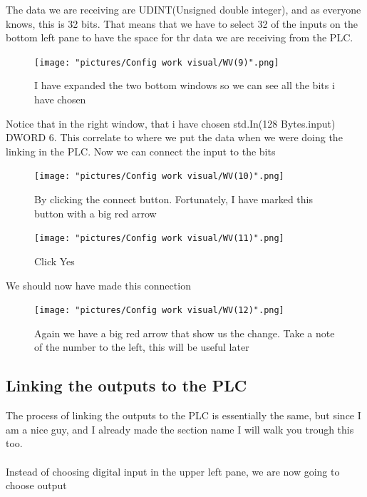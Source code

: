 \documentclass{article}
\begin{document}
\newpage

The data we are receiving are UDINT(Unsigned double integer), and as everyone knows, this is 32 bits. That means that we have to select 32 of the inputs on the bottom left pane to have the space for thr data we are receiving from the PLC. 

\begin{figure}[!h]
    \centering
    \texttt{[image: "pictures/Config work visual/WV(9)".png]}
    \caption{I have expanded the two bottom windows so we can see all the bits i have chosen}
    \label{fig:my_label}
\end{figure}

Notice that in the right window, that i have chosen std.In(128 Bytes.input) DWORD 6. This correlate to where we put the data when we were doing the linking in the PLC.
\newpage
Now we can connect the input to the bits


\begin{figure}[!h]
    \centering
    \texttt{[image: "pictures/Config work visual/WV(10)".png]}
    \caption{By clicking the connect button. Fortunately, I have marked this button with a big red arrow}
    \label{fig:my_label}
\end{figure}



\begin{figure}[!h]
    \centering
    \texttt{[image: "pictures/Config work visual/WV(11)".png]}
    \caption{Click Yes}
    \label{fig:my_label}
\end{figure}

\newpage

We should now have made this connection
\begin{figure}[!h]
    \centering
    \texttt{[image: "pictures/Config work visual/WV(12)".png]}
    \caption{Again we have a big red arrow that show us the change. Take a note of the number to the left, this will be useful later}
    \label{fig:my_label}
\end{figure}

\newpage

\subsection{Linking the outputs to the PLC }

The process of linking the outputs to the PLC is essentially the same, but since I am a nice guy, and I already made the section name  I will walk you trough this too. 
\\\\
Instead of choosing digital input in the upper left pane, we are now going to choose output
\end{document}
